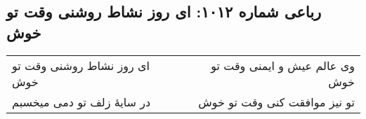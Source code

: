 \begin{center}
\section*{رباعی شماره ۱۰۱۲: ای روز نشاط روشنی وقت تو خوش}
\label{sec:1012}
\begin{longtable}{l p{0.5cm} r}
ای روز نشاط روشنی وقت تو خوش
&&
وی عالم عیش و ایمنی وقت تو خوش
\\
در سایهٔ زلف تو دمی میخسبم
&&
تو نیز موافقت کنی وقت تو خوش
\\
\end{longtable}
\end{center}
